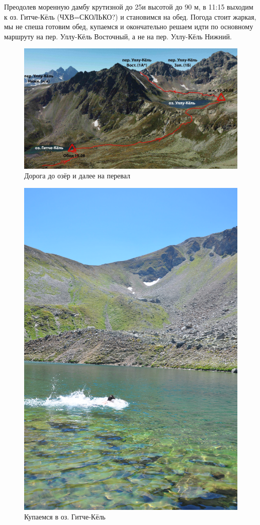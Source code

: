 Преодолев моренную дамбу крутизной до 25\degree и высотой до 90 м, в 11:15 выходим к оз. Гитче-Кёль (ЧХВ=\alert{СКОЛЬКО?}) и становимся на обед. 
Погода стоит жаркая, мы не спеша готовим обед, купаемся и окончательно решаем идти по основному маршруту на пер. Уллу-Кёль Восточный, а не на пер. Уллу-Кёль Нижний.



\begin{figure}[h]
	\centering
	\includegraphics[width=0.7\linewidth]{../pics/ullu_kuel_route}
	\caption{Дорога до озёр и далее на перевал}
	\label{fig:ullu_kuel_route}
\end{figure}

\begin{figure}[h]
	\centering
	\begin{turn}{90}
		\includegraphics[width=0.7\linewidth]{../pics/DSC_0774}
	\end{turn}
	\caption{Купаемся в оз. Гитче-Кёль}
	\label{fig:DSC_0774}
\end{figure}


